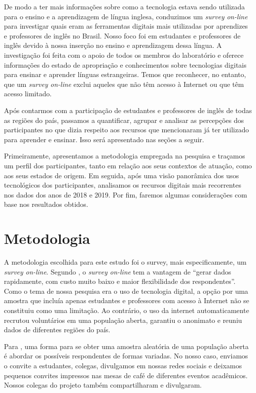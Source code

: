 \documentclass[portuguese]{textolivre}
\begin{document}
De modo a ter mais informações sobre como a tecnologia estava sendo utilizada para o ensino e a aprendizagem de língua inglesa, conduzimos um \textit{survey on-line} para investigar quais eram as ferramentas digitais mais utilizadas por aprendizes e professores de inglês no Brasil. Nosso foco foi em estudantes e professores de inglês devido à nossa inserção no ensino e aprendizagem dessa língua. A investigação foi feita com o apoio de todos os membros do laboratório e oferece informações do estado de apropriação e conhecimentos sobre tecnologias digitais para ensinar e aprender línguas estrangeiras. Temos que reconhecer, no entanto, que um \textit{survey on-line} exclui aqueles que não têm acesso à Internet ou que têm acesso limitado.

Após contarmos com a participação de estudantes e professores de inglês de todas as regiões do país, passamos a quantificar, agrupar e analisar as percepções dos participantes no que dizia respeito aos recursos que mencionaram já ter utilizado para aprender e ensinar.  Isso será apresentado nas seções a seguir.

Primeiramente, apresentamos a metodologia empregada na pesquisa e traçamos um perfil dos participantes, tanto em relação aos seus contextos de atuação, como aos seus estados de origem. Em seguida, após uma visão panorâmica dos usos tecnológicos dos participantes, analisamos os recursos digitais mais recorrentes nos dados dos anos de 2018 e 2019. Por fim, faremos algumas considerações com base nos resultados obtidos.

\section{Metodologia}\label{sec-normas}
A metodologia escolhida para este estudo foi o survey, mais especificamente, um \textit{survey on-line}. Segundo \textcite[p. 184]{sue_conducting_2007}, o \textit{survey on-line} tem a vantagem de “gerar dados rapidamente, com custo muito baixo e maior flexibilidade dos respondentes”.  Como o tema de nossa pesquisa era o uso de tecnologia digital, a opção por uma amostra que incluía apenas estudantes e professores com acesso à Internet não se constituiu como uma limitação. Ao contrário, o uso da internet automaticamente recrutou voluntários em uma população aberta, garantiu o anonimato e reuniu dados de diferentes regiões do país.  

Para \textcite{sue_conducting_2007}, uma forma para se obter uma amostra aleatória de uma população aberta é abordar os possíveis respondentes de formas variadas. No nosso caso, enviamos o convite a estudantes, colegas, divulgamos em nossas redes sociais e deixamos pequenos convites impressos nas mesas de café de diferentes eventos acadêmicos. Nossos colegas do projeto também compartilharam e divulgaram.  
\end{document}
